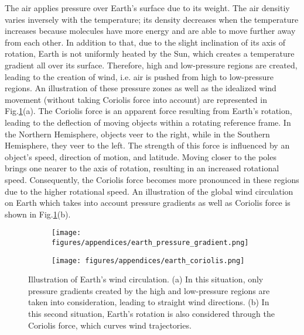 \begin{multicols}{2}
The air applies pressure over Earth's surface due to its weight. The air densitiy varies inversely with the temperature; its density decreases when the temperature increases because molecules have more energy and are able to move further away from each other. In addition to that, due to the slight inclination of its axis of rotation, Earth is not uniformly heated by the Sun, which creates a temperature gradient all over its surface. Therefore, high and low-pressure regions are created, leading to the creation of wind, i.e. air is pushed from high to low-pressure regions. An illustration of these pressure zones as well as the idealized wind movement (without taking Coriolis force into account) are represented in Fig.\ref{C2 - FIG - Illustration of pressure gradient and Coriolis force}(a).
\columnbreak
The Coriolis force is an apparent force resulting from Earth's rotation, leading to the deflection of moving objects within a rotating reference frame. In the Northern Hemisphere, objects veer to the right, while in the Southern Hemisphere, they veer to the left. The strength of this force is influenced by an object's speed, direction of motion, and latitude. Moving closer to the poles brings one nearer to the axis of rotation, resulting in an increased rotational speed. Consequently, the Coriolis force becomes more pronounced in these regions due to the higher rotational speed. An illustration of the global wind circulation on Earth which takes into account pressure gradients as well as Coriolis force is shown in Fig.\ref{C2 - FIG - Illustration of pressure gradient and Coriolis force}(b).\vfill
\end{multicols}

\newpage

\begin{figure}[!t]
    \begin{subfigure}[c]{0.5\textwidth}
    	\texttt{[image: figures/appendices/earth\_pressure\_gradient.png]}
        \caption{}
    \end{subfigure}
    \hfill
    \begin{subfigure}[c]{0.5\textwidth}
    	 \vspace{0.3mm}
        \texttt{[image: figures/appendices/earth\_coriolis.png]}
        \caption{}
    \end{subfigure}
    \caption{Illustration of Earth's wind circulation. (a) In this situation, only pressure gradients created by the high and low-pressure regions are taken into consideration, leading to straight wind directions. (b) In this second situation, Earth's rotation is also considered through the Coriolis force, which curves wind trajectories.}
    \label{C2 - FIG - Illustration of pressure gradient and Coriolis force}
    \vspace{-0.5em}
\end{figure}

